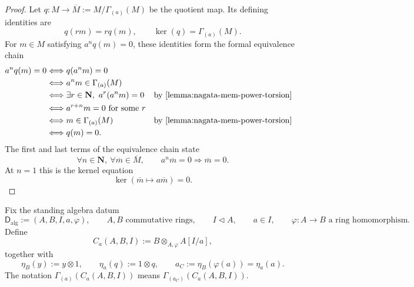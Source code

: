 \begin{proof}
  Let
  $q\colon M\to\overline M:=M/\Gamma_{(a)}(M)$ be the quotient map.  Its
  defining identities are
  \[
    q(rm)=r q(m),\qquad
    \ker(q)=\Gamma_{(a)}(M).
  \]
  For $m\in M$ satisfying $a^nq(m)=0$, these identities form the formal
  equivalence chain
  \[
  \begin{aligned}
    a^nq(m)=0
      &\Longleftrightarrow q(a^nm)=0\\
      &\Longleftrightarrow a^nm\in\Gamma_{(a)}(M)\\
      &\Longleftrightarrow
        \exists r\in\mathbf N,\ a^r(a^nm)=0
        &&\text{by \Cref{lemma:nagata-mem-power-torsion}}\\
      &\Longleftrightarrow a^{r+n}m=0\text{ for some }r\\
      &\Longleftrightarrow m\in\Gamma_{(a)}(M)
        &&\text{by \Cref{lemma:nagata-mem-power-torsion}}\\
      &\Longleftrightarrow q(m)=0.
  \end{aligned}
  \]
  The first and last terms of the equivalence chain state
  \[
    \forall n\in\mathbf N,\ \forall\overline m\in\overline M,\qquad
    a^n\overline m=0\Longrightarrow\overline m=0.
  \]
  At $n=1$ this is the kernel equation
  \[
    \ker(\overline m\mapsto a\overline m)=0.
  \]
\end{proof}

\begin{definition}
  \label{def:nagata-strict-transform-basechange-chart-ring}

  Fix the standing algebra datum
  \[
    \mathsf D_{\mathrm{alg}}
      :=(A,B,I,a,\varphi),\qquad
    A,B\text{ commutative rings},\qquad
    I\triangleleft A,\qquad a\in I,\qquad
    \varphi\colon A\to B\text{ a ring homomorphism}.                \tag{STAlg0}
  \]
  Define
  \[
    C_a(A,B,I):=B\otimes_{A,\varphi}A[I/a],
  \]
  together with
  \[
    \eta_B(y):=y\otimes1,\qquad
    \eta_a(q):=1\otimes q,\qquad
    a_C:=\eta_B(\varphi(a))=\eta_a(a).
  \]
  The notation $\Gamma_{(a)}(C_a(A,B,I))$ means
  $\Gamma_{(a_C)}(C_a(A,B,I))$.
\end{definition}

